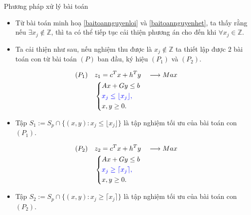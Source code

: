 \documentclass[10pt]{beamer}
\begin{document}
\begin{frame}{Phương pháp xử lý bài toán}
\large
\begin{itemize}
\item<1-> Từ bài toán minh hoạ \eqref{baitoannguyenloi} và \eqref{baitoannguyenhet}, ta thấy rằng nếu $\exists x_j \notin \mathbb{Z}$, thì ta có thể tiếp tục cải thiện phương án cho đến khi $\forall x_j \in \mathbb{Z}$. 
\bigskip
\item<2-> Ta cải thiện như sau, nếu nghiệm thu được là $x_j \notin \mathbb{Z}$ ta thiết lập được 2 bài toán con từ bài toán $(P)$ ban đầu, ký hiệu $(P_1)$ và $(P_2)$.
\end{itemize}
\end{frame}

\begin{frame}
\begin{equation}
    \begin{split}
    (P_1) \quad & z_1=c^Tx+h^Ty \quad \longrightarrow Max \\
                & \left\{\begin{split}
                    &Ax+Gy \leq  b \\
                    &\color{blue} x_j \leq \lfloor x_j \rfloor , \\
                    &x,y \geq 0.
                \end{split}\right.    
    \end{split}
\end{equation}
\begin{itemize}
\item Tập $S_1:=S_p \cap \{ (x,y): x_j \leq \lfloor x_j \rfloor \}$ là tập nghiệm tối ưu của bài toán con $(P_1)$.
\end{itemize}
\end{frame}

\begin{frame}
\begin{equation}
    \begin{split}
    (P_2) \quad & z_2=c^Tx+h^Ty \quad \longrightarrow Max \\
                & \left\{\begin{split}
                    &Ax+Gy \leq  b \\
                    &\color{blue} x_j \geq \lceil x_j \rceil , \\
                    &x,y \geq 0.
                \end{split}\right.    
    \end{split}
\end{equation}
\begin{itemize}
\item Tập $S_2:=S_p \cap \{ (x,y): x_j \geq \lceil x_j \rceil \}$ là tập nghiệm tối ưu của bài toán con $(P_2)$.
\end{itemize}
\end{frame}
\end{document}
